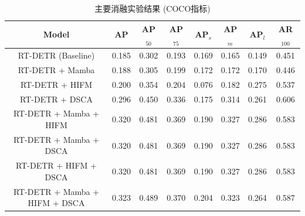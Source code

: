 \begin{table}[h]
\centering
\caption{主要消融实验结果 (COCO指标)}
\label{tab:ablation}
\begin{tabular}{c|c|c|c|c|c|c|c}
\hline
Model & AP & AP$_{50}$ & AP$_{75}$ & AP$_{s}$ & AP$_{m}$ & AP$_{l}$ & AR$_{100}$ \\
\hline
RT-DETR (Baseline) & 0.185 & 0.302 & 0.193 & 0.169 & 0.165 & 0.149 & 0.451 \\
\hline
RT-DETR + Mamba & 0.188 & 0.305 & 0.199 & 0.172 & 0.172 & 0.170 & 0.446 \\
\hline
RT-DETR + HIFM & 0.200 & 0.354 & 0.204 & 0.076 & 0.182 & 0.275 & 0.537 \\
\hline
RT-DETR + DSCA & 0.296 & 0.450 & 0.336 & 0.175 & 0.314 & 0.261 & 0.606 \\
\hline
RT-DETR + Mamba + HIFM & 0.320 & 0.481 & 0.369 & 0.190 & 0.327 & 0.286 & 0.583 \\
\hline
RT-DETR + Mamba + DSCA & 0.320 & 0.481 & 0.369 & 0.190 & 0.327 & 0.286 & 0.583 \\
\hline
RT-DETR + HIFM + DSCA & 0.320 & 0.481 & 0.369 & 0.190 & 0.327 & 0.286 & 0.583 \\
\hline
RT-DETR + Mamba + HIFM + DSCA & 0.323 & 0.489 & 0.370 & 0.204 & 0.323 & 0.264 & 0.587 \\
\hline
\end{tabular}
\end{table}
